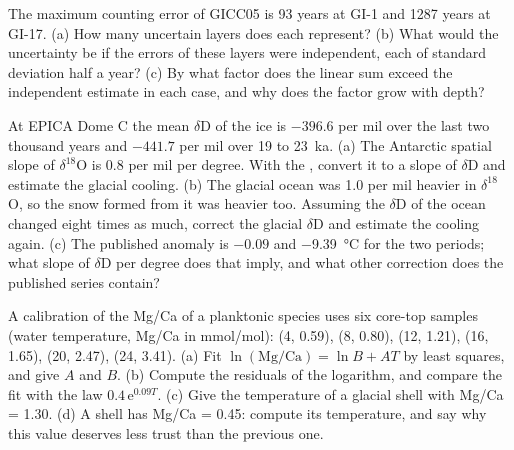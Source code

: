 \begin{exercise}[$\star\star$]\label{exo:b2:climate-proxies:9}
The maximum counting error of GICC05 is 93 years at GI-1 and \num{1287} years at GI-17. (a) How many
uncertain layers does each represent? (b) What would the uncertainty be if the errors of these
layers were independent, each of standard deviation half a year? (c) By what factor does the
linear sum exceed the independent estimate in each case, and why does the factor grow with depth?
\end{exercise}

\begin{exercise}[$\star\star\star$]\label{exo:b2:climate-proxies:10}
At EPICA Dome C the mean $\delta$D of the ice is $-396.6$ per mil over the last two thousand years
and $-441.7$ per mil over 19 to \qty{23}{ka}. (a) The Antarctic spatial slope of $\delta^{18}$O is
\num{0.8} per mil per degree. With the , convert it to a slope of $\delta$D and
estimate the glacial cooling. (b) The glacial ocean was \num{1.0} per mil heavier in
$\delta^{18}$O, so the snow formed from it was heavier too. Assuming the $\delta$D of the ocean
changed eight times as much, correct the glacial $\delta$D and estimate the cooling again.
(c) The published anomaly is $-0.09$ and \qty{-9.39}{\celsius} for the two periods; what slope of
$\delta$D per degree does that imply, and what other correction does the published series contain?
\end{exercise}

\begin{exercise}[$\star\star\star$]\label{exo:b2:climate-proxies:11}
A calibration of the Mg/Ca of a planktonic species uses six core-top samples (water temperature,
Mg/Ca in \unit{mmol/mol}): (4, 0.59), (8, 0.80), (12, 1.21), (16, 1.65), (20, 2.47), (24, 3.41).
(a) Fit $\ln(\text{Mg/Ca}) = \ln B + AT$ by least squares, and give $A$ and $B$. (b) Compute the
residuals of the logarithm, and compare the fit with the law $0.4\,\mathrm{e}^{0.09T}$. (c) Give the
temperature of a glacial shell with Mg/Ca = 1.30. (d) A shell has Mg/Ca = 0.45: compute its
temperature, and say why this value deserves less trust than the previous one.
\end{exercise}

